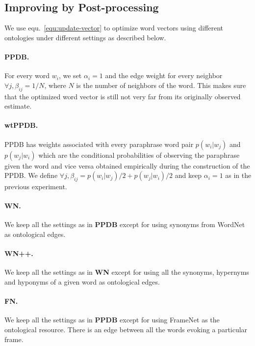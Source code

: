 \documentclass[11pt]{article}
\begin{document}
\subsection{Improving by Post-processing}
\label{sec:post-proc}

We use equ.~\ref{equ:update-vector} to optimize word vectors using different ontologies
under different settings as described below.

\paragraph{PPDB.} For every word $w_i$, we set $\alpha_i = 1$ and the edge weight for every neighbor $\forall j, \beta_{ij} = 1/N$, where $N$ is the number of neighbors of the word. This makes sure that the optimized word vector is still not very far from its originally observed estimate.

\paragraph{wtPPDB.} PPDB has weights associated with every paraphrase word pair $p(w_i | w_j)$ and $p(w_j |w_i)$ which are the conditional probabilities of 
observing the paraphrase given the word and vice versa obtained empirically during the construction of the PPDB. We define $\forall j, \beta_{ij} = p(w_i | w_j)/2 + p(w_j |w_i)/2$ and keep $\alpha_i = 1$ as in the previous experiment.

\paragraph{WN.} We keep all the settings as in \textbf{PPDB} except for using 
synonyms from WordNet as ontological edges.

\paragraph{WN++.} We keep all the settings as in \textbf{WN} except for using all 
the synonyms, hypernyms and hyponyms of a given word as ontological edges.

\paragraph{FN.} We keep all the settings as in \textbf{PPDB} except for using 
FrameNet as the ontological resource. There is an edge between all the words evoking
a particular frame.
\end{document}
